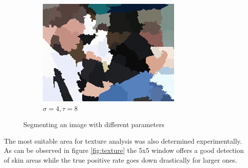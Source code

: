 \documentclass[12pt]{report}
\begin{document}
\begin{figure}[h!]
\begin{subfigure}[b]{0.3\linewidth}
			\includegraphics[width=\linewidth]{resources/segm_4_8.png}
			\caption{$\sigma = 4, \tau = 8$}
		\end{subfigure}
		\caption{Segmenting an image with different parameters}
		\label{fig:segmentation}
	\end{figure}
	
	The most suitable area for texture analysis was also determined experimentally. As can be observed in figure \ref{fig:texture} the 5x5 window offers a good detection of skin areas while the true positive rate goes down drastically for larger ones.
	
\end{document}
